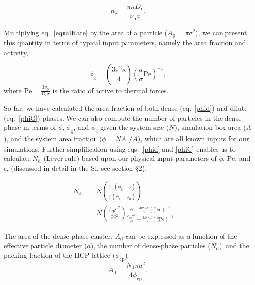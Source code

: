 \documentclass[twoside,twocolumn,9pt]{article}
\begin{document}
\begin{equation}\label{equalRate}
    n_\text{g} = \frac{\pi \kappa D_\text{r}}{\nu_\text{p}a}.
\end{equation}

\noindent Multiplying eq.~\ref{equalRate} by the area of a particle ($A_\text{p}=\pi\sigma^2$), we can present this quantity in terms of typical input parameters, namely the area fraction and activity,

\begin{equation}\label{phiG}
    \phi_\text{g} = \left(\frac{3\pi^{2}\kappa}{4}\right)\left(\frac{a}{\sigma} \mathrm{Pe}\right)^{-1}, 
\end{equation}
where $\mathrm{Pe}=\frac{3 v_\text{p}}{D_\text{r} \sigma}$ is the ratio of active to thermal forces. 

So far, we have calculated the area fraction of both dense (eq.~\ref{phid}) and dilute (eq.~\ref{phiG}) phases. We can also compute the number of particles in the dense phase in terms of $\phi$, $\phi_\text{g}$, and $\phi_\text{d}$ given the system size ($N$), simulation box area ($A$), and the system area fraction ($\phi=NA_\text{p}/A$), which are all known inputs for our simulations.  Further simplification using eqs.~\ref{phid} and \ref{phiG} enables us to calculate $N_\text{d}$ (Lever rule) based upon our physical input parameters of $\phi$, $\mathrm{Pe}$, and $\epsilon$, (discussed in detail in the SI, see section \S2),

\begin{align}
    N_\text{d} &= N\left( \frac{\phi_\text{d}(\phi_\text{g}-\phi )}{\phi (\phi_\text{g}-\phi_\text{d})} \right) \nonumber \\
    &= N \left( \frac{\phi_\text{cp}\sigma^{2}}{\phi a^{2}} \right)
    \frac{ \phi-\frac{3\pi^{2}\kappa\sigma}{4}\left( \frac{a}{\sigma} \mathrm{Pe}\right)^{-1}}
    {\frac{\phi_\text{cp}\sigma^{2}}{a^{2}}-\frac{3\pi^{2}\kappa\sigma}{4}\left( \frac{a}{\sigma} \mathrm{Pe}\right)^{-1}} \quad . \label{nl}
\end{align}

The area of the dense phase cluster, $A_\text{d}$  can be expressed as a function of the effective particle diameter ($a$), the number of dense-phase particles ($N_\text{d}$), and the packing fraction of the HCP lattice ($\phi_\text{cp}$):
\begin{equation}\label{ac}
    A_\text{d}=\frac{N_\text{d}\pi a^{2}}{4 \phi_\text{cp}}.
\end{equation}
\end{document}
